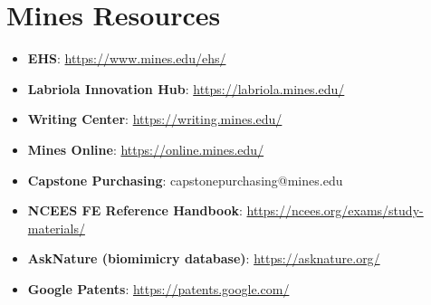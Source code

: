 \section*{Mines Resources}
\begin{itemize}[leftmargin=1.5em]
\item \textbf{EHS}: \url{https://www.mines.edu/ehs/}
\item \textbf{Labriola Innovation Hub}: \url{https://labriola.mines.edu/}
\item \textbf{Writing Center}: \url{https://writing.mines.edu/}
\item \textbf{Mines Online}: \url{https://online.mines.edu/}
\item \textbf{Capstone Purchasing}: capstonepurchasing@mines.edu
\item \textbf{NCEES FE Reference Handbook}: \url{https://ncees.org/exams/study-materials/}
\item \textbf{AskNature (biomimicry database)}: \url{https://asknature.org/}
\item \textbf{Google Patents}: \url{https://patents.google.com/}
\end{itemize}

